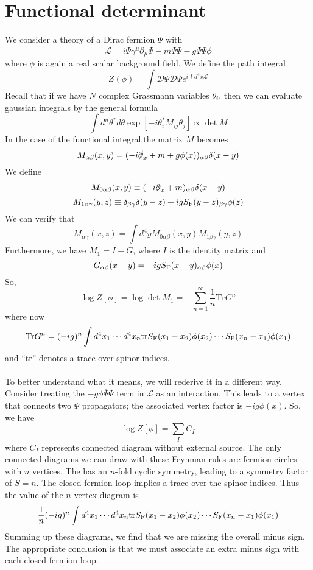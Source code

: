 \section{Functional determinant}
We consider a theory of a Dirac fermion $\Psi$ with
\[\mathcal{L} = i\overline{\Psi} \gamma^{\mu} \partial_{\mu} \Psi - m\overline{\Psi}\Psi -g \overline{\Psi}\Psi\phi\]
where $\phi$ is again a real scalar background field. We define the path integral
\[Z(\phi) = \int \mathcal{D}\overline{\Psi}\mathcal{D}\Psi e^{i\int d^4x \mathcal{L}} \]
Recall that if we have $N$ complex Grassmann variables $\theta_i$, then we can evaluate gaussian integrals by the general formula
\[\int d^n\theta^* d\theta \exp[-i\theta^{*}_i M_{ij}\theta_j] \propto \det M\]
In the case of the functional integral,the matrix $M$ becomes
\[M_{\alpha\beta}(x,y) = (-i\slashed{\partial}_x + m + g\phi(x))_{\alpha\beta}\delta(x-y)\]
We define
\[M_{0\alpha\beta}(x,y) \equiv (-i\slashed{\partial}_x + m )_{\alpha\beta}\delta(x-y)\]
\[M_{1\beta\gamma}(y,z) \equiv \delta_{\beta\gamma}\delta(y-z) + igS_{\rm F}(y-z)_{\beta\gamma}\phi(z)\]
We can verify that
\[M_{\alpha\gamma}(x,z) = \int d^4y M_{0\alpha\beta}(x,y)M_{1\beta\gamma}(y,z) \]
Furthermore, we have $M_1 = I - G$, where $I$ is the identity matrix and
\[G_{\alpha\beta}(x-y) = -igS_{\rm F}(x-y)_{\alpha\beta}\phi(x)\]
So, 
\[\log Z[\phi] = \log \det M_1 = -\sum_{n=1}^{\infty} \frac{1}{n} \mathrm{Tr}G^n\]
where now
\[\mathrm{Tr}G^n = (-ig)^n \int d^4x_1 \cdots d^4x_n \mathrm{tr} S_{\rm F}(x_1-x_2)\phi(x_2) \cdots S_{\rm F}(x_n-x_1)\phi(x_1)\]
and ``tr'' denotes a trace over spinor indices.
\\ \\
To better understand what it means, we will rederive it in a different way. 
Consider treating the $-g\phi\overline{\Psi}\Psi$ term in $\mathcal{L}$ as an interaction. This leads to a vertex that connects two $\Psi$ propagators; the associated vertex factor
is $-ig\phi(x)$. 
So, we have
\[\log Z[\phi] = \sum_{I}C_I\]
where $C_I$ represents connected diagram without external source. The only connected diagrams we can draw with these Feynman rules are fermion circles with $n$ vertices. 
The has an $n$-fold cyclic symmetry, leading to a symmetry factor of $S= n$. The closed fermion loop implies a trace over the spinor indices. Thus the value of the $n$-vertex diagram is
\[\frac{1}{n}(-ig)^n \int d^4x_1 \cdots d^4x_n \mathrm{tr} S_{\rm F}(x_1-x_2)\phi(x_2) \cdots S_{\rm F}(x_n-x_1)\phi(x_1)\]
Summing up these diagrams, we find that we are missing the overall minus sign. The appropriate conclusion is that we must associate an extra minus sign with each closed fermion loop.